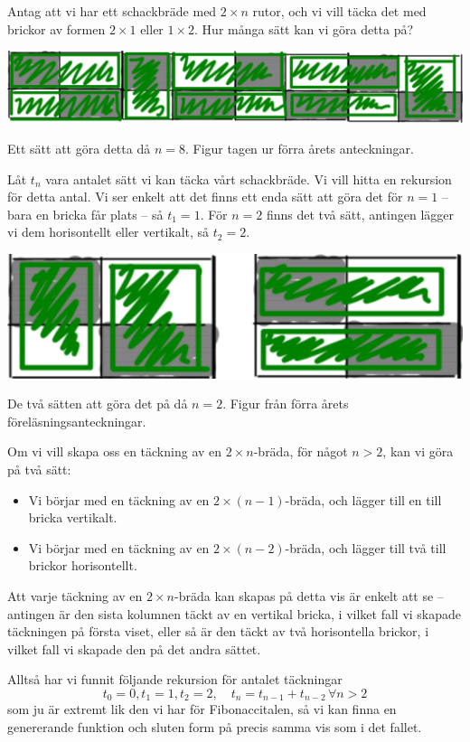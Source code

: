 \documentclass[nobib]{tufte-handout}
\begin{document}
\begin{example}
  Antag att vi har ett schackbräde med $2\times n$ rutor, och vi vill täcka det med brickor av formen $2\times 1$ eller $1\times 2$. Hur många sätt kan vi göra detta på?

  \begin{marginfigure}
    \includegraphics{graphics/checkerboard_tiling.png}
    \caption{Ett sätt att göra detta då $n=8$. Figur tagen ur förra årets anteckningar.}
  \end{marginfigure}

  Låt $t_n$ vara antalet sätt vi kan täcka vårt schackbräde. Vi vill hitta en rekursion för detta antal. Vi ser enkelt att det finns ett enda sätt att göra det för $n=1$ -- bara en bricka får plats -- så $t_1 = 1$. För $n=2$ finns det två sätt, antingen lägger vi dem horisontellt eller vertikalt, så $t_2 = 2$.

  \begin{marginfigure}
    \includegraphics{graphics/checkerboard_tiling_n_2.png}
    \caption{De två sätten att göra det på då $n=2$. Figur från förra årets föreläsningsanteckningar.}
  \end{marginfigure}

  Om vi vill skapa oss en täckning av en $2\times n$-bräda, för något $n > 2$, kan vi göra på två sätt:
  \begin{itemize}
    \item Vi börjar med en täckning av en $2\times(n-1)$-bräda, och lägger till en till bricka vertikalt.
    \item Vi börjar med en täckning av en $2\times(n-2)$-bräda, och lägger till två till brickor horisontellt.
  \end{itemize}

  Att varje täckning av en $2\times n$-bräda kan skapas på detta vis är enkelt att se -- antingen är den sista kolumnen täckt av en vertikal bricka, i vilket fall vi skapade täckningen på första viset, eller så är den täckt av två horisontella brickor, i vilket fall vi skapade den på det andra sättet.

  Alltså har vi funnit följande rekursion för antalet täckningar
  $$t_0 = 0, t_1 = 1, t_2 = 2, \quad t_n = t_{n-1} + t_{n-2} \, \forall n > 2$$
  som ju är extremt lik den vi har för Fibonaccitalen, så vi kan finna en genererande funktion och sluten form på precis samma vis som i det fallet.
\end{example}
\end{document}
